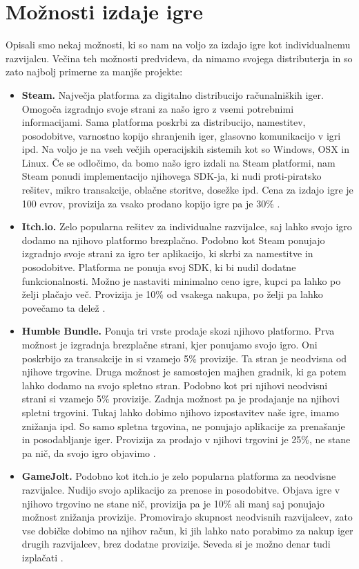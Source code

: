 \documentclass[12pt,a4paper,twoside]{book}
\begin{document}
\section{Možnosti izdaje igre}
Opisali smo nekaj možnosti, ki so nam na voljo za izdajo igre kot individualnemu razvijalcu. Večina teh možnosti predvideva, da nimamo svojega distributerja in so zato najbolj primerne za manjše projekte:
\begin{itemize}
	\item \textbf{Steam.} Največja platforma za digitalno distribucijo računalniških iger. Omogoča izgradnjo svoje strani za našo igro z vsemi potrebnimi informacijami. Sama platforma poskrbi za distribucijo, namestitev, posodobitve, varnostno kopijo shranjenih iger, glasovno komunikacijo v igri ipd. Na voljo je na vseh večjih operacijskih sistemih kot so Windows, OSX in Linux. Če se odločimo, da bomo našo igro izdali na Steam platformi, nam Steam ponudi implementacijo njihovega SDK-ja, ki nudi proti-piratsko rešitev, mikro transakcije, oblačne storitve, dosežke ipd. Cena za izdajo igre je 100 evrov, provizija za vsako prodano kopijo igre pa je 30\% \cite{steam}.
	\item \textbf{Itch.io.} Zelo popularna rešitev za individualne razvijalce, saj lahko svojo igro dodamo na njihovo platformo brezplačno. Podobno kot Steam ponujajo izgradnjo svoje strani za igro ter aplikacijo, ki skrbi za namestitve in posodobitve. Platforma ne ponuja svoj SDK, ki bi nudil dodatne funkcionalnosti. Možno je nastaviti minimalno ceno igre, kupci pa lahko po želji plačajo več. Provizija je 10\% od vsakega nakupa, po želji pa lahko povečamo ta delež \cite{itchiofaq}.
	\item \textbf{Humble Bundle.} Ponuja tri vrste prodaje skozi njihovo platformo. Prva možnost je izgradnja brezplačne strani, kjer ponujamo svojo igro. Oni poskrbijo za transakcije in si vzamejo 5\% provizije. Ta stran je neodvisna od njihove trgovine. Druga možnost je samostojen majhen gradnik, ki ga potem lahko dodamo na svojo spletno stran. Podobno kot pri njihovi neodvisni strani si vzamejo 5\% provizije. Zadnja možnost pa je prodajanje na njihovi spletni trgovini. Tukaj lahko dobimo njihovo izpostavitev naše igre, imamo znižanja ipd. So samo spletna trgovina, ne ponujajo aplikacije za prenašanje in posodabljanje iger. Provizija za prodajo v njihovi trgovini je 25\%, ne stane pa nič, da svojo igro objavimo \cite{humblebundle}.
	\item \textbf{GameJolt.} Podobno kot itch.io je zelo popularna platforma za neodvisne razvijalce. Nudijo svojo aplikacijo za prenose in posodobitve. Objava igre v njihovo trgovino ne stane nič, provizija pa je 10\% ali manj saj ponujajo možnost znižanja provizije. Promovirajo skupnost neodvisnih razvijalcev, zato vse dobičke dobimo na njihov račun, ki jih lahko nato porabimo za nakup iger drugih razvijalcev, brez dodatne provizije. Seveda si je možno denar tudi izplačati \cite{gamejolt}.

\end{itemize}
\end{document}
